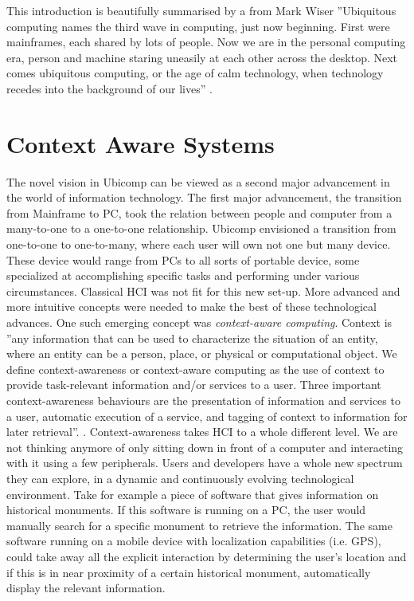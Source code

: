 This introduction is beautifully summarised by a from Mark Wiser ''Ubiquitous computing names the third wave in computing, just now beginning. First were mainframes, each shared by lots of people. Now we are in the personal computing era, person and machine staring uneasily at each other across the desktop. Next comes ubiquitous computing, or the age of calm technology, when technology recedes into the background of our lives'' \cite{wiser_bio:online}.

\section{Context Aware Systems}
The novel vision in Ubicomp can be viewed as a second major advancement in the world of information technology. The first major advancement, the transition from Mainframe to PC, took the relation between people and computer from a many-to-one to a one-to-one relationship. Ubicomp envisioned a transition from one-to-one to one-to-many, where each user will own not one but many device. These device would range from PCs to all sorts of portable device, some specialized at accomplishing specific tasks and performing under various circumstances. Classical HCI was not fit for this new set-up. More advanced and more intuitive concepts were needed to make the best of these technological advances. One such emerging concept was \emph{context-aware computing}. Context is ''any information that can be used to characterize the situation of an entity, where an entity can be a person, place, or physical or computational object. We define context-awareness or context-aware computing as the use of context to provide task-relevant information and/or services to a user. Three important context-awareness behaviours are the presentation of information and services to a user, automatic execution of a service, and tagging of context to information for later retrieval''. \cite{abowd1999towards}. Context-awareness takes HCI to a whole different level. We are not thinking anymore of only sitting down in front of a computer and interacting with it using a few peripherals. Users and developers have a whole new spectrum they can explore, in a dynamic and continuously evolving technological environment. Take for example a piece of software that gives information on historical monuments. If this software is running on a PC, the user would manually search for a specific monument to retrieve the information. The same software running on a mobile device with localization capabilities (i.e. GPS), could take away all the explicit interaction by determining the user's location and if this is in near proximity of a certain historical monument, automatically display the relevant information.\\

